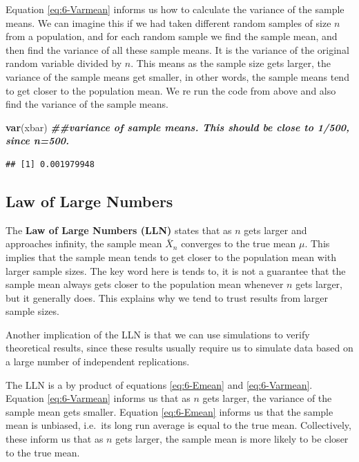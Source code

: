 \documentclass[
]{book}
\newenvironment{Shaded}{\begin{snugshade}}{\end{snugshade}}
\newcommand{\DocumentationTok}[1]{\textcolor[rgb]{0.56,0.35,0.01}{\textbf{\textit{#1}}}}
\newcommand{\FunctionTok}[1]{\textcolor[rgb]{0.13,0.29,0.53}{\textbf{#1}}}
\newcommand{\NormalTok}[1]{#1}
\begin{document}
Equation \eqref{eq:6-Varmean} informs us how to calculate the variance of the sample means. We can imagine this if we had taken different random samples of size \(n\) from a population, and for each random sample we find the sample mean, and then find the variance of all these sample means. It is the variance of the original random variable divided by \(n\). This means as the sample size gets larger, the variance of the sample means get smaller, in other words, the sample means tend to get closer to the population mean. We re run the code from above and also find the variance of the sample means.

\begin{Shaded}
\begin{Highlighting}[]
\FunctionTok{var}\NormalTok{(xbar) }\DocumentationTok{\#\#variance of sample means. This should be close to 1/500, since n=500. }
\end{Highlighting}
\end{Shaded}

\begin{verbatim}
## [1] 0.001979948
\end{verbatim}

\subsection{Law of Large Numbers}\label{law-of-large-numbers}

The \textbf{Law of Large Numbers (LLN)} states that as \(n\) gets larger and approaches infinity, the sample mean \(\bar{X}_n\) converges to the true mean \(\mu\). This implies that the sample mean tends to get closer to the population mean with larger sample sizes. The key word here is tends to, it is not a guarantee that the sample mean always gets closer to the population mean whenever \(n\) gets larger, but it generally does. This explains why we tend to trust results from larger sample sizes.

Another implication of the LLN is that we can use simulations to verify theoretical results, since these results usually require us to simulate data based on a large number of independent replications.

The LLN is a by product of equations \eqref{eq:6-Emean} and \eqref{eq:6-Varmean}. Equation \eqref{eq:6-Varmean} informs us that as \(n\) gets larger, the variance of the sample mean gets smaller. Equation \eqref{eq:6-Emean} informs us that the sample mean is unbiased, i.e.~its long run average is equal to the true mean. Collectively, these inform us that as \(n\) gets larger, the sample mean is more likely to be closer to the true mean.
\end{document}
